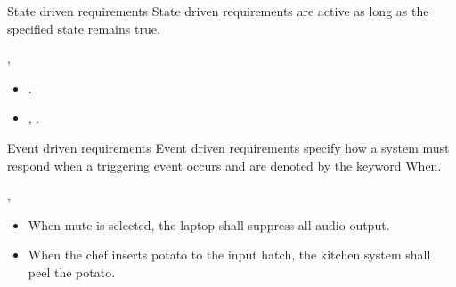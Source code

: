 \documentclass[aspectratio=169]{beamer}
\begin{document}
\begin{slide}{State driven requirements}
  State driven requirements are active as long as the specified state remains true.
    \begin{block}{}\centering
      \ewhile[<precondition(s)>],
    \end{block}  
  
  \begin{example}
  \begin{itemize}
    \item {} \ethe[ATM] .
    \item {},  .
  \end{itemize}
  \end{example}

\end{slide}





\begin{slide}{Event driven requirements}
  Event driven requirements specify how a system must respond when a triggering event occurs and are denoted by the keyword When.
    \begin{block}{}\centering
      \ewhen[<trigger>], 
    \end{block}
  
  \begin{example}
  \begin{itemize}
    \item When mute is selected, the laptop shall suppress all audio output.
    \item When the chef inserts potato to the input hatch, the kitchen system shall peel the potato.
  \end{itemize}
  \end{example}
\end{slide}
\end{document}
